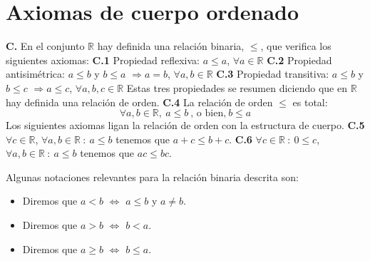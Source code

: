 \section{Axiomas de cuerpo ordenado}
\textbf{C.}\label{Axioma_C} En el conjunto $\mathbb{R}$ hay definida una relación binaria, $\leq$, que verifica los
siguientes axiomas:
\newline
\newline
\hspace*{1cm} \textbf{C.1} Propiedad reflexiva: $a \leq a$, $\forall a \in \mathbb{R}$
\newline
\newline
\hspace*{1cm} \textbf{C.2} Propiedad antisimétrica: $a \leq b$ y $b \leq a$ $\Longrightarrow a = b$, $\forall a,b \in \mathbb{R}$
\newline
\newline
\hspace*{1cm} \textbf{C.3} Propiedad transitiva: $a \leq b$ y $b \leq c$ $\Longrightarrow a \leq c$, $\forall a,b,c \in \mathbb{R}$
\newline
\newline
Estas tres propiedades se resumen diciendo que en $\mathbb{R}$ hay definida una relación de orden.
\newline
\newline
\hspace*{1cm} \textbf{C.4} La relación de orden $\leq$ es total:
\begin{equation*}
    \forall a,b \in \mathbb{R},~a \leq b ~\text{, o bien,}~ b \leq a
\end{equation*}
Los siguientes axiomas ligan la relación de orden con la estructura de cuerpo.
\newline
\newline
\hspace*{1cm} \textbf{C.5} $\forall c \in \mathbb{R}$, $\forall a,b \in \mathbb{R} ~:~ a \leq b$ tenemos que $a+c \leq b+c$.
\newline
\newline
\hspace*{1cm} \textbf{C.6} $\forall c \in \mathbb{R} ~:~ 0 \leq c$, $\forall a,b \in \mathbb{R} ~:~ a \leq b$ tenemos que
$ac \leq bc$.\\

\begin{notacion}
    Algunas notaciones relevantes para la relación binaria descrita son:
    \begin{itemize}
        \item Diremos que $a < b$ $\Longleftrightarrow$ $a \leq b$ y $a \neq b$.
        \item Diremos que $a > b$ $\Longleftrightarrow$ $b < a$.
        \item Diremos que $a \geq b$ $\Longleftrightarrow$  $b \leq a$. 
    \end{itemize}
\end{notacion}

